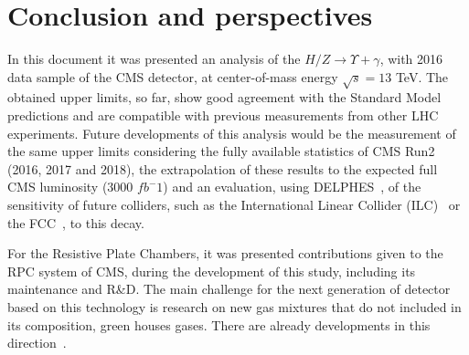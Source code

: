\chapter{Conclusion and perspectives}
\label{chapter_conclusion_and_perspectives}

In this document it was presented an analysis of the $H/Z \rightarrow \Upsilon + \gamma$, with 2016 data sample of the CMS detector, at center-of-mass energy $\sqrt{s}=13$ TeV. The obtained upper limits, so far, show good agreement with the Standard Model predictions and are compatible with previous measurements from other LHC experiments. Future developments of this analysis would be the measurement of the same upper limits considering the fully available statistics of CMS Run2 (2016, 2017 and 2018), the extrapolation of these results to the expected full CMS luminosity (3000 $fb^-1$) and an evaluation, using DELPHES~\cite{delphes},  of the sensitivity of future colliders, such as the International Linear Collider (ILC)~\cite{ilc} or the FCC~\cite{fcc}, to this decay.

For the Resistive Plate Chambers, it was presented contributions given to the RPC system of CMS, during the development of this study, including its maintenance and R\&D. The main challenge for the next generation of detector based on this technology is research on new gas mixtures that do not included in its composition, green houses gases. There are already developments in this direction~\cite{eco_gas}. 